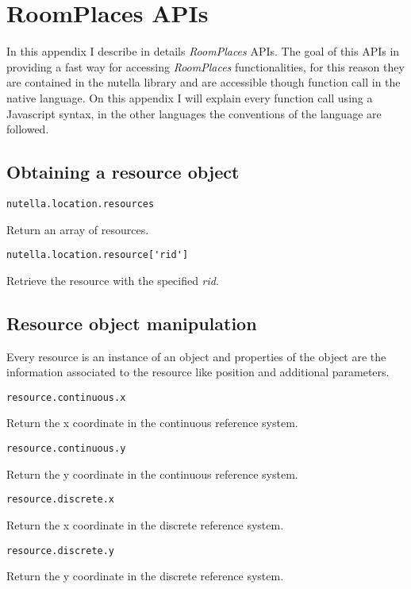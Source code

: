 \chapter{RoomPlaces APIs}

\label{apdx:roomplaces_api}

In this appendix I describe in details \textit{RoomPlaces} APIs. The goal of this APIs in providing a fast way for accessing \textit{RoomPlaces} functionalities, for this reason they are contained in the nutella library and are accessible though function call in the native language. On this appendix I will explain every function call using a Javascript syntax, in the other languages the conventions of the language are followed.

\section{Obtaining a resource object}

\begin{lstlisting}
nutella.location.resources
\end{lstlisting}
Return an array of resources.

\begin{lstlisting}
nutella.location.resource['rid']
\end{lstlisting}
Retrieve the resource with the specified \textit{rid}.

\section{Resource object manipulation}
Every resource is an instance of an object and properties of the object are the information associated to the resource like position and additional parameters.

\begin{lstlisting}
resource.continuous.x
\end{lstlisting}
Return the x coordinate in the continuous reference system. 

\begin{lstlisting}
resource.continuous.y
\end{lstlisting}
Return the y coordinate in the continuous reference system.

\begin{lstlisting}
resource.discrete.x
\end{lstlisting}
Return the x coordinate in the discrete reference system.

\begin{lstlisting}
resource.discrete.y
\end{lstlisting}
Return the y coordinate in the discrete reference system.

